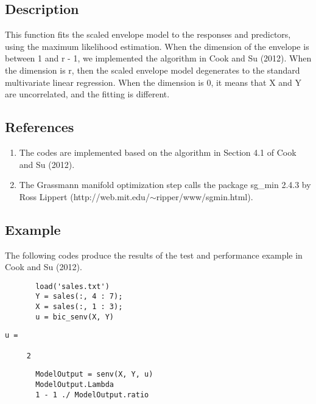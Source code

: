 \documentclass[a4paper,11pt,openany]{memoir}
\begin{document}
\subsection*{Description}

\begin{par}
This function fits the scaled envelope model to the responses and predictors, using the maximum likelihood estimation.  When the dimension of the envelope is between 1 and r - 1, we implemented the algorithm in Cook and Su (2012).  When the dimension is r, then the scaled envelope model degenerates to the standard multivariate linear regression.  When the dimension is 0, it means that X and Y are uncorrelated, and the fitting is different.
\end{par} \vspace{1em}


\subsection*{References}

\begin{enumerate}
\setlength{\itemsep}{-1ex}
   \item The codes are implemented based on the algorithm in Section 4.1 of Cook and Su (2012).
   \item The Grassmann manifold optimization step calls the package sg\_min 2.4.3 by Ross Lippert (http://web.mit.edu/$\sim$ripper/www/sgmin.html).
\end{enumerate}


\subsection*{Example}

\begin{par}
The following codes produce the results of the test and performance example in Cook and Su (2012).
\end{par} \vspace{1em}

\begin{verbatim}       load('sales.txt')
       Y = sales(:, 4 : 7);
       X = sales(:, 1 : 3);
       u = bic_senv(X, Y)\end{verbatim}    
        \color{lightgray}\ttfamily \begin{verbatim}
u =

     2
\end{verbatim} \rmfamily
\color{black}       
       \begin{verbatim}
       ModelOutput = senv(X, Y, u)
       ModelOutput.Lambda
       1 - 1 ./ ModelOutput.ratio\end{verbatim}
\end{document}
